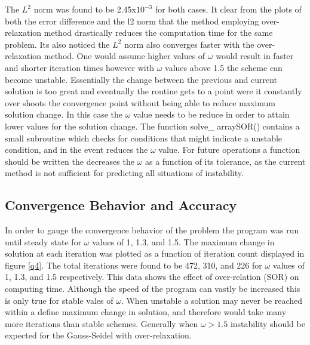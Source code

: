 \documentclass[paper=a4, fontsize=11pt, abstract=on]{scrartcl}
\numberwithin{equation}{section}		%
\numberwithin{figure}{section}			%
\numberwithin{table}{section}				%
\begin{document}
The $L^2$ norm was found to be 2.45x$10^{-3}$ for both cases. It clear from the plots of both the error difference and the l2 norm that the method employing over-relaxation method drastically reduces the computation time for the same problem. Its also noticed the $L^2$ norm also converges faster with the over-relaxation method. One would assume higher values of $\omega$ would result in faster and shorter iteration times however with $\omega$ values above 1.5 the scheme can become unstable.  Essentially the change between the previous and current solution is too great and eventually the routine gets to a point were it constantly over shoots the convergence point without being able to reduce maximum solution change. In this case the $\omega$ value needs to be reduce in order to attain lower values for the solution change. The function solve\_ arraySOR() contains a small subroutine which checks for conditions that might indicate a unstable condition, and in the event reduces the $\omega$ value. For  future operations a function should be written the decreases the $\omega$ as a function of its tolerance, as the current method is not sufficient for predicting all situations of instability.

\subsection{Convergence Behavior and Accuracy}
In order to gauge the convergence behavior of the problem the program was run until steady state for $\omega$ values of 1, 1.3, and 1.5. The maximum change in solution at each iteration was plotted as a function of iteration count displayed in figure \ref{q4}. The total iterations were found to be 472, 310, and 226 for $\omega$ values of 1, 1.3, and 1.5 respectively. This data shows the effect of over-relation (SOR) on computing time. Although the speed of the program can vastly be increased this is only true for stable vales of $\omega$. When unstable a solution may never be reached within a define maximum change in solution, and therefore would take many more iterations than stable schemes. Generally when $\omega > 1.5$ instability should be expected for the Gauss-Seidel with over-relaxation. 
\end{document}
